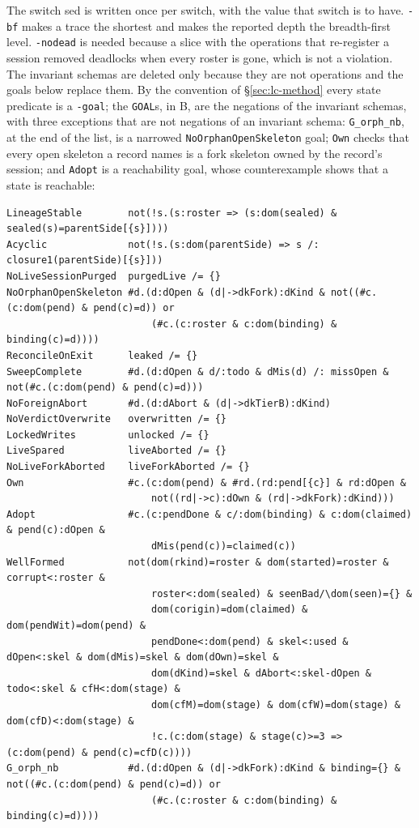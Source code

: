 \documentclass[a4paper,10pt,fleqn]{article}
\begin{document}
\noindent The switch sed is written once per switch, with the value that
switch is to have. \texttt{-bf} makes a trace the shortest and makes the
reported depth the breadth-first level. \texttt{-nodead} is needed because a
slice with the operations that re-register a session removed deadlocks when
every roster is gone, which is not a violation. The invariant schemas are
deleted only because they are not operations and the goals below replace
them. By the convention of \S\ref{sec:lc-method} every state predicate is a
\texttt{-goal}; the \texttt{GOAL}s, in B, are the negations of the invariant
schemas, with three exceptions that are not negations of an invariant
schema: \texttt{G\_orph\_nb}, at the end of the list, is a narrowed
\texttt{NoOrphanOpenSkeleton} goal; \texttt{Own} checks that every open
skeleton a record names is a fork skeleton owned by the record's session; and \texttt{Adopt} is a reachability goal,
whose counterexample shows that a state is reachable:

\begin{verbatim}
LineageStable        not(!s.(s:roster => (s:dom(sealed) & sealed(s)=parentSide[{s}])))
Acyclic              not(!s.(s:dom(parentSide) => s /: closure1(parentSide)[{s}]))
NoLiveSessionPurged  purgedLive /= {}
NoOrphanOpenSkeleton #d.(d:dOpen & (d|->dkFork):dKind & not((#c.(c:dom(pend) & pend(c)=d)) or
                         (#c.(c:roster & c:dom(binding) & binding(c)=d))))
ReconcileOnExit      leaked /= {}
SweepComplete        #d.(d:dOpen & d/:todo & dMis(d) /: missOpen & not(#c.(c:dom(pend) & pend(c)=d)))
NoForeignAbort       #d.(d:dAbort & (d|->dkTierB):dKind)
NoVerdictOverwrite   overwritten /= {}
LockedWrites         unlocked /= {}
LiveSpared           liveAborted /= {}
NoLiveForkAborted    liveForkAborted /= {}
Own                  #c.(c:dom(pend) & #rd.(rd:pend[{c}] & rd:dOpen &
                         not((rd|->c):dOwn & (rd|->dkFork):dKind)))
Adopt                #c.(c:pendDone & c/:dom(binding) & c:dom(claimed) & pend(c):dOpen &
                         dMis(pend(c))=claimed(c))
WellFormed           not(dom(rkind)=roster & dom(started)=roster & corrupt<:roster &
                         roster<:dom(sealed) & seenBad/\dom(seen)={} &
                         dom(corigin)=dom(claimed) & dom(pendWit)=dom(pend) &
                         pendDone<:dom(pend) & skel<:used & dOpen<:skel & dom(dMis)=skel & dom(dOwn)=skel &
                         dom(dKind)=skel & dAbort<:skel-dOpen & todo<:skel & cfH<:dom(stage) &
                         dom(cfM)=dom(stage) & dom(cfW)=dom(stage) & dom(cfD)<:dom(stage) &
                         !c.(c:dom(stage) & stage(c)>=3 => (c:dom(pend) & pend(c)=cfD(c))))
G_orph_nb            #d.(d:dOpen & (d|->dkFork):dKind & binding={} & not((#c.(c:dom(pend) & pend(c)=d)) or
                         (#c.(c:roster & c:dom(binding) & binding(c)=d))))
\end{verbatim}
\end{document}
